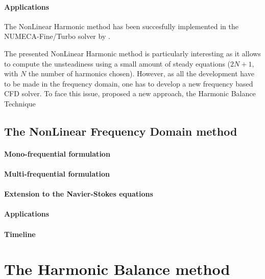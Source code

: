 \paragraph{Applications}
The NonLinear Harmonic method 
has been succesfully implemented
in the NUMECA-Fine/Turbo solver by 
\citet{Vilmin2006, Vilmin2007, Vilmin2009, Vilmin2013a}.

The presented NonLinear Harmonic method is particularly interesting
as it allows to compute the unsteadiness using a small amount 
of steady equations ($2N + 1$, with $N$ the number of harmonics chosen).
However, as all the development have to be made in the frequency domain,
one has to develop a new frequency based CFD solver. To face this issue,
\citet{Hall2002} proposed a new approach, the Harmonic Balance Technique


\subsection{The NonLinear Frequency Domain method} %
\label{sub:the_nonlinear_frequency_domain_method}

\paragraph{Mono-frequential formulation}

\paragraph{Multi-frequential formulation}

\paragraph{Extension to the Navier-Stokes equations}

\paragraph{Applications}

\paragraph{Timeline}



\section{The Harmonic Balance method} %
\label{sec:sm_harmonic_balance}

